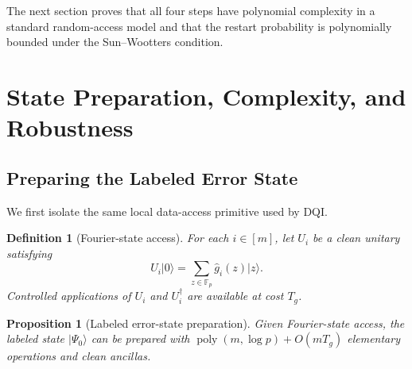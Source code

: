 \documentclass[10pt,a4paper]{amsart}
\newtheorem{proposition}[theorem]{Proposition}
\newtheorem{definition}[theorem]{Definition}
\newcommand{\F}{\mathbb{F}}
\newcommand{\poly}{\operatorname{poly}}
\newcommand{\ket}[1]{\lvert #1\rangle}
\begin{document}
The next section proves that all four steps have polynomial complexity in a standard random-access model and that the restart probability is polynomially bounded under the Sun--Wootters condition.

\section{State Preparation, Complexity, and Robustness}

\subsection{Preparing the Labeled Error State}

We first isolate the same local data-access primitive used by DQI.

\begin{definition}[Fourier-state access]
For each $i\in[m]$, let $U_i$ be a clean unitary satisfying
\begin{equation}
   U_i\ket{0}=\sum_{z\in\F_p}\widehat g_i(z)\ket{z}.
   \label{eq:local-fourier-state}
\end{equation}
Controlled applications of $U_i$ and $U_i^\dagger$ are available at cost $T_g$.
\end{definition}

\begin{proposition}[Labeled error-state preparation]
\label{prop:shell-prep}
Given Fourier-state access, the labeled state $\ket{\Psi_0}$ can be prepared with
$\poly(m,\log p)+O(mT_g)$ elementary operations and clean ancillas.
\end{proposition}
\end{document}
